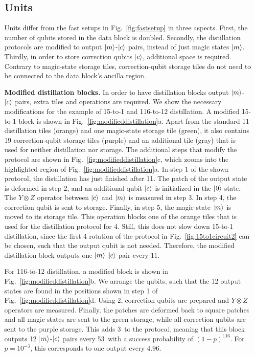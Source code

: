 \documentclass[prx,aps,letterpaper,twocolumn,allowfontchageintitle=true,accepted=2019-02-01]{quantumarticle}
\begin{document}
\subsection{Units}

Units differ from the fast setups in Fig.~\ref{fig:fastsetup} in three aspects. First, the number of qubits stored in the data block is doubled. Secondly, the distillation protocols are modified to output $\ket{m}$-$\ket{c}$ pairs, instead of just magic states $\ket{m}$. Thirdly, in order to store correction qubits $\ket{c}$, additional space is required. Contrary to magic-state storage tiles, correction-qubit storage tiles do not need to be connected to the data block's ancilla region.



\textbf{Modified distillation blocks.} In order to have distillation blocks output $\ket{m}$-$\ket{c}$ pairs, extra tiles and operations are required. We show the necessary modifications for the example of 15-to-1 and 116-to-12 distillation. A modified 15-to-1 block is shown in Fig.~\ref{fig:modifieddistillation}a. Apart from the standard 11 distillation tiles (orange) and one magic-state storage tile (green), it also contains 19 correction-qubit storage tiles (purple) and an additional tile (gray) that is used for neither distillation nor storage. The additional steps that modify the protocol are shown in Fig.~\ref{fig:modifieddistillation}c, which zooms into the highlighted region of Fig.~\ref{fig:modifieddistillation}a. In step 1 of the shown protocol, the distillation has just finished after 11\clock. The patch of the output state is deformed in step 2, and an additional qubit $\ket{c}$ is initialized in the $\ket{0}$ state. The $Y\otimes Z$ operator between $\ket{c}$ and $\ket{m}$ is measured in step 3. In step 4, the correction qubit is sent to storage. Finally, in step 5, the magic state $\ket{m}$ is moved to its storage tile. This operation blocks one of the orange tiles that is used for the distillation protocol for 4\clock. Still, this does not slow down 15-to-1 distillation, since the first 4 rotation of the protocol in Fig.~\ref{fig:15to1circuit2} can be chosen, such that the output qubit is not needed. Therefore, the modified distillation block outputs one $\ket{m}$-$\ket{c}$ pair every 11\clock.




For 116-to-12 distillation, a modified block is shown in Fig.~\ref{fig:modifieddistillation}b. We arrange the qubits, such that the 12 output states are found in the positions shown in step 1 of Fig.~\ref{fig:modifieddistillation}d. Using 2\clock, correction qubits are prepared and $Y \otimes Z$ operators are measured. Finally, the patches are deformed back to square patches and all magic states are sent to the green storage, while all correction qubits are sent to the purple storage. This adds 3\clock \ to the protocol, meaning that this block outputs 12 $\ket{m}$-$\ket{c}$ pairs every 53\clock \ with a success probability of $(1-p)^{116}$. For $p=10^{-3}$, this corresponds to one output every 4.96\clock.
\end{document}
